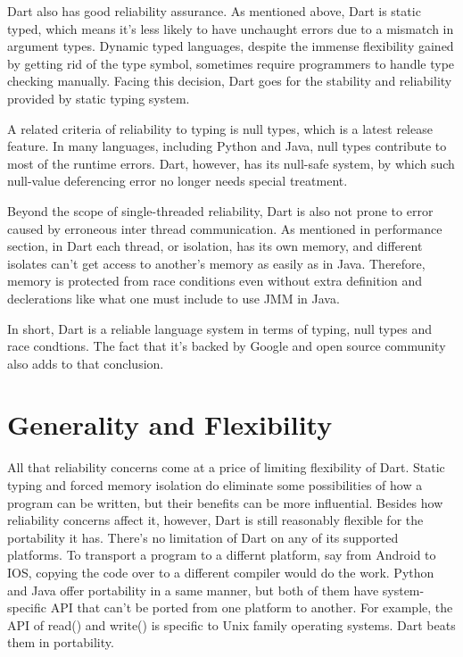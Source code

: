 \documentclass[letterpaper,twocolumn,10pt]{article}
\begin{document}
Dart also has good reliability assurance.
As mentioned above, Dart is static typed, which means it's less likely to have unchaught errors due to a mismatch in argument types.
Dynamic typed languages, despite the immense flexibility gained by getting rid of the type symbol, sometimes require programmers to handle type checking manually.
Facing this decision, Dart goes for the stability and reliability provided by static typing system.

A related criteria of reliability to typing is null types, which is a latest release feature. 
In many languages, including Python and Java, null types contribute to most of the runtime errors.
Dart, however, has its null-safe system, by which such null-value deferencing error no longer needs special treatment.

Beyond the scope of single-threaded reliability, Dart is also not prone to error caused by erroneous inter thread communication.
As mentioned in performance section, in Dart each thread, or isolation, has its own memory, and different isolates can't get access to another's memory as easily as in Java.
Therefore, memory is protected from race conditions even without extra definition and declerations like what one must include to use JMM in Java.

In short, Dart is a reliable language system in terms of typing, null types and race condtions. 
The fact that it's backed by Google and open source community also adds to that conclusion.

\section{Generality and Flexibility}

All that reliability concerns come at a price of limiting flexibility of Dart. 
Static typing and forced memory isolation do eliminate some possibilities of how a program can be written, but their benefits can be more influential.
Besides how reliability concerns affect it, however, Dart is still reasonably flexible for the portability it has.
There's no limitation of Dart on any of its supported platforms.
To transport a program to a differnt platform, say from Android to IOS, copying the code over to a different compiler would do the work.
Python and Java offer portability in a same manner, but both of them have system-specific API that can't be ported from one platform to another.
For example, the API of read() and write() is specific to Unix family operating systems.
Dart beats them in portability.
\end{document}
